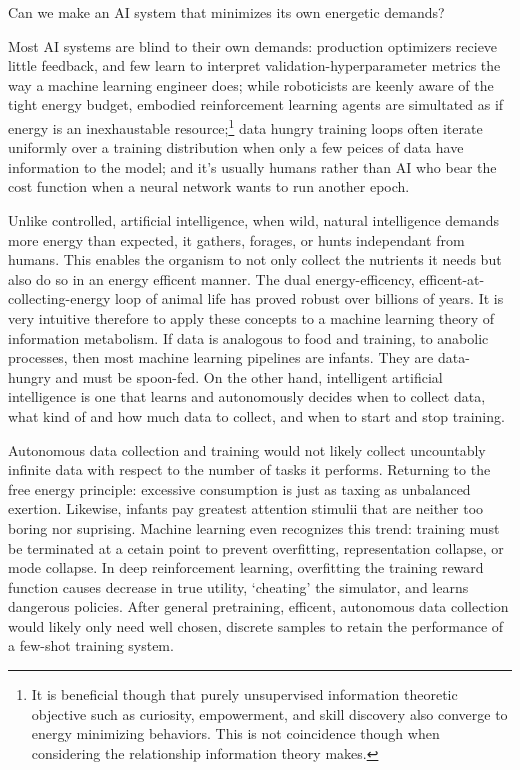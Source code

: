 \begin{center}
Can we make an AI system that minimizes its own energetic demands?
\end{center}

Most AI systems are blind to their own demands: production optimizers recieve little feedback, and few learn to interpret validation-hyperparameter metrics the way a machine learning engineer does; while roboticists are keenly aware of the  tight energy budget, embodied reinforcement learning agents are simultated as if energy is an inexhaustable resource;\footnote{It is beneficial though that purely unsupervised information theoretic objective such as curiosity, empowerment, and skill discovery also converge to energy minimizing behaviors. This is not coincidence though when considering the relationship information theory makes.} data hungry training loops often iterate uniformly over a training distribution when only a few peices of data have information to the model; and it's usually humans rather than AI who bear the cost function when a neural network wants to run another epoch. 

Unlike controlled, artificial intelligence, when wild, natural intelligence demands more energy than expected, it gathers, forages, or hunts independant from humans. This enables the organism to not only collect the nutrients it needs but also do so in an energy efficent manner. The dual energy-efficency, efficent-at-collecting-energy loop of animal life has proved robust over billions of years. It is very intuitive therefore to apply these concepts to a machine learning theory of information metabolism. If data is analogous to food and training, to anabolic processes, then most machine learning pipelines are infants. They are data-hungry and must be spoon-fed. On the other hand, intelligent artificial intelligence is one that learns and autonomously decides when to collect data, what kind of and how much data to collect, and when to start and stop training. 

Autonomous data collection and training would not likely collect uncountably infinite data with respect to the number of tasks it performs. Returning to the free energy principle: excessive consumption is just as taxing as unbalanced exertion. Likewise, infants pay greatest attention stimulii that are neither too boring nor suprising. Machine learning even recognizes this trend: training must be terminated at a cetain point to prevent overfitting, representation collapse, or mode collapse. In deep reinforcement learning, overfitting the training reward function causes decrease in true utility, `cheating' the simulator, and learns dangerous policies. After general pretraining, efficent, autonomous data collection would likely only need well chosen, discrete samples to retain the performance of a few-shot training system. 

